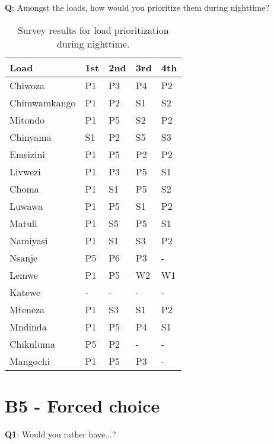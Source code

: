 \textbf{Q}: Amongst the loads, how would you prioritize them during nighttime?\\

\begin{table}[ht!]
\centering
    \begin{tabular}{ m{4cm} m{1.5cm} m{1.5cm} m{1.5cm} m{1.5cm}} 
    \toprule
    \toprule
    \textbf{Load} & \textbf{1st} & \textbf{2nd} & \textbf{3rd} & \textbf{4th}\\
    \midrule
    Chiwoza         & P1 & P3 & P4 & P2 \\
    Chimwamkango    & P1 & P2 & S1 & S2 \\
    Mitondo         & P1 & P5 & S2 & P2 \\
    Chinyama        & S1 & P2 & S5 & S3 \\
    Emsizini        & P1 & P5 & P2 & P2 \\
    Livwezi         & P1 & P3 & P5 & S1 \\
    Choma           & P1 & S1 & P5 & S2 \\
    Luwawa          & P1 & P5 & S1 & P2 \\
    Matuli          & P1 & S5 & P5 & S1 \\
    Namiyasi        & P1 & S1 & S3 & P2 \\
    Nsanje          & P5 & P6 & P3 & - \\
    Lemwe           & P1 & P5 & W2 & W1 \\
    Katewe          &  - & -  & -  & - \\
    Mteneza         & P1 & S3 & S1 & P2 \\
    Mndinda         & P1 & P5 & P4 & S1 \\
    Chikuluma       & P5 & P2 & -  & - \\
    Mangochi        & P1 & P5 & P3 & - \\
    
    \bottomrule
    \bottomrule
    \end{tabular}
\caption[User survey- Load prioritization nighttime]{Survey results for load prioritization during nighttime.}
\end{table}

\newpage
\section*{\large{B5 - Forced choice}}\label{seq:forced_choice}
\vspace*{1cm}

\textbf{Q1}: Would you rather have...?\\

